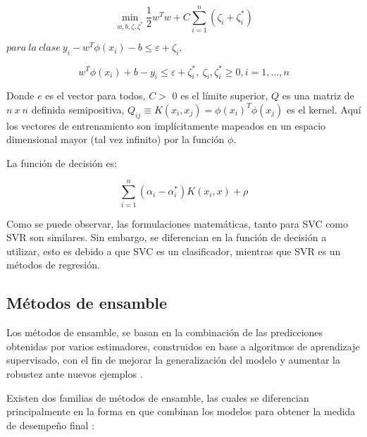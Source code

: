 \begin{equation}	
	\min_ {w, b, \zeta, \zeta^*} \frac{1}{2} w^T w + C \sum_{i=1}^{n} (\zeta_i + \zeta_i^*)	
\end{equation}

\begin{center}
	
	$para\ la\ clase\ y_i - w^T \phi (x_i) - b \leq \varepsilon + \zeta_i,$
\end{center}
\begin{equation}
	w^T \phi (x_i) + b - y_i \leq \varepsilon + \zeta_i^*,\ \zeta_i, \zeta_i^* \geq 0, i=1, ..., n
\end{equation}

Donde $e$ es el vector para todos, $C >$ 0 es el límite superior, $Q$ es una matriz de $n\ x\ n$ definida semipositiva, $Q_{ij} \equiv K(x_i, x_j) = \phi (x_i)^T \phi (x_j)$ es el kernel. Aquí los vectores de
entrenamiento son implícitamente mapeados en un espacio dimensional mayor (tal vez infinito) por
la función $\phi$.

La función de decisión es:

\begin{equation}
	\sum_{i=1}^n (\alpha_i - \alpha_i^*) K(x_i, x) + \rho
\end{equation}

Como se puede observar, las formulaciones matemáticas, tanto para SVC como SVR son similares. Sin embargo, se diferencian en la función de decisión a utilizar, esto es debido a que SVC es un clasificador, mientras que SVR es un métodos de regresión.

\subsection{Métodos de ensamble}

Los métodos de ensamble, se basan en la combinación de las predicciones obtenidas por varios estimadores, construidos en base a algoritmos de aprendizaje supervisado, con el fin de mejorar la generalización del modelo y aumentar la robustez ante nuevos ejemplos \cite{dietterich2000ensemble}.

Existen dos familias de métodos de ensamble, las cuales se diferencian principalmente en la forma en que combinan los modelos para obtener la medida de desempeño final \cite{kotsiantis2007supervised}:

